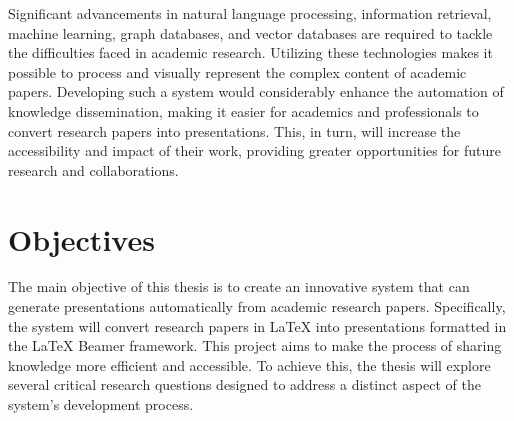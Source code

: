 Significant advancements in natural language processing, information retrieval, machine learning, graph databases, and vector databases are required to tackle the difficulties faced in academic research. Utilizing these technologies makes it possible to process and visually represent the complex content of academic papers. Developing such a system would considerably enhance the automation of knowledge dissemination, making it easier for academics and professionals to convert research papers into presentations. This, in turn, will increase the accessibility and impact of their work, providing greater opportunities for future research and collaborations.

\section{Objectives}
\label{sec:intro:objectives}


The main objective of this thesis is to create an innovative system that can generate presentations automatically from academic research papers. Specifically, the system will convert research papers in \LaTeX{} into presentations formatted in the \LaTeX{} Beamer framework. This project aims to make the process of sharing knowledge more efficient and accessible. To achieve this, the thesis will explore several critical research questions designed to address a distinct aspect of the system's development process.

